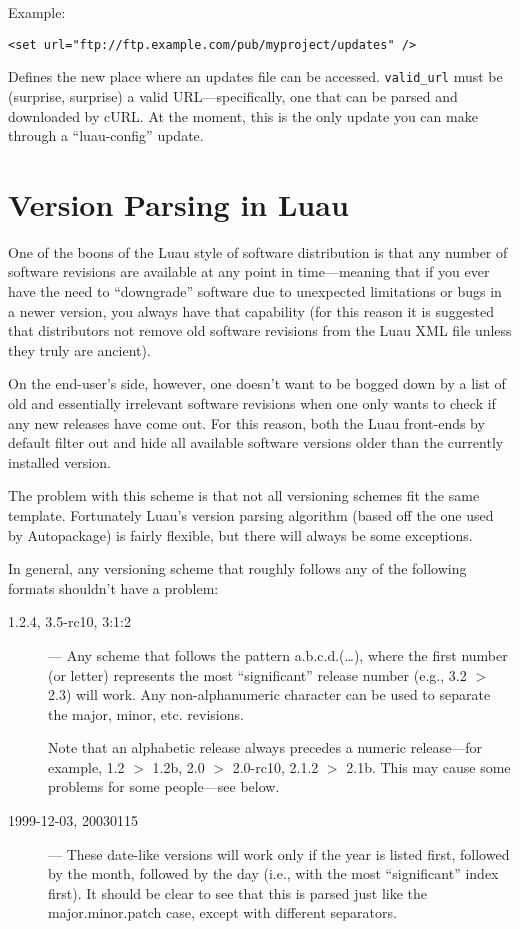 \documentclass{report}
\begin{document}
Example:

\begin{verbatim}
<set url="ftp://ftp.example.com/pub/myproject/updates" />
\end{verbatim}

Defines the new place where an updates file can be accessed.  \texttt{valid\_url} must be (surprise, surprise) a valid URL---specifically, one that can be parsed and downloaded by cURL.  At the moment, this is the only update you can make through a ``luau-config'' update.

\section{Version Parsing in Luau}
\label{sec:versionparsing}

One of the boons of the Luau style of software distribution is that any number of software revisions are available at any point in time---meaning that if you ever have the need to ``downgrade'' software due to unexpected limitations or bugs in a newer version, you always have that capability (for this reason it is suggested that distributors not remove old software revisions from the Luau XML file unless they truly are ancient).

On the end-user's side, however, one doesn't want to be bogged down by a list of old and essentially irrelevant software revisions when one only wants to check if any new releases have come out.  For this reason, both the Luau front-ends by default filter out and hide all available software versions older than the currently installed version.

The problem with this scheme is that not all versioning schemes fit the same template.  Fortunately Luau's version parsing algorithm (based off the one used by Autopackage) is fairly flexible, but there will always be some exceptions.

In general, any versioning scheme that roughly follows any of the following formats shouldn't have a problem:

\begin{description}
\item[1.2.4, 3.5-rc10, 3:1:2]--- Any scheme that follows the pattern a.b.c.d.(\ldots), where the first number (or letter) represents the most ``significant'' release number (e.g., 3.2 $>$ 2.3) will work.  Any non-alphanumeric character can be used to separate the major, minor, etc. revisions.

Note that an alphabetic release always precedes a numeric release---for example, 1.2 $>$ 1.2b, 2.0 $>$ 2.0-rc10, 2.1.2 $>$ 2.1b.  This may cause some problems for some people---see below.

\item[1999-12-03, 20030115]--- These date-like versions will work only if the year is listed first, followed by the month, followed by the day (i.e., with the most ``significant'' index first).  It should be clear to see that this is parsed just like the major.minor.patch case, except with different separators.
\end{description}
\end{document}

